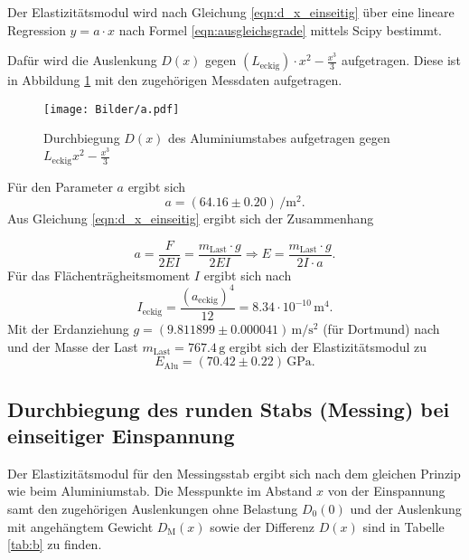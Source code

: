 Der Elastizitätsmodul wird nach Gleichung \eqref{eqn:d_x_einseitig} über eine lineare Regression $y= a\cdot x$ nach Formel \eqref{eqn:ausgleichsgrade} mittels Scipy \cite{scipy} bestimmt.

Dafür wird die Auslenkung $D(x)$ gegen $(L_{\mathrm{eckig}})\cdot x^2-\frac{x^3}{3}$ aufgetragen.
Diese ist in Abbildung \ref{fig:Alu_einseitig} mit den zugehörigen Messdaten aufgetragen.
\begin{figure}
	\centering
	\texttt{[image: Bilder/a.pdf]}
	\caption{Durchbiegung $D(x)$ des Aluminiumstabes aufgetragen gegen $L_{\mathrm{eckig}}x^2-\frac{x^3}{3}$}
	\label{fig:Alu_einseitig}
\end{figure}

Für den Parameter $a$ ergibt sich
\begin{equation*}
	a=(64.16\pm 0.20) \,\si{\per\square\meter}  \text{.}
\end{equation*}
Aus Gleichung \eqref{eqn:d_x_einseitig} ergibt sich der Zusammenhang

\begin{equation}
	a= \frac{F}{2EI}=\frac{m_{\mathrm{Last}}\cdot g}{2EI} \Rightarrow E=\frac{m_{\mathrm{Last}}\cdot g}{2I\cdot a} \text{.}
\end{equation}
Für das Flächenträgheitsmoment $I$ ergibt sich nach \cite{bla}
\begin{equation}
	I_{\mathrm{eckig}}=\frac{(a_{\mathrm{eckig}})^4}{12}= 8.34 \cdot 10^{-10} \,\si{\meter\tothe{4}}	 \text{.}
\end{equation}
Mit der Erdanziehung $g=(9.811899 \pm 0.000041) \,\si{\meter\per\square\second}$ (für Dortmund) nach \cite{G} und der Masse der Last $m_{\mathrm{Last}}=767.4\,\si{\gram}$ ergibt sich der Elastizitätsmodul zu
\begin{equation*}
	E_{\mathrm{Alu}}= (70.42 \pm 0.22)\,\si{\giga\pascal} \text{.}
\end{equation*}
\FloatBarrier
\subsection{Durchbiegung des runden Stabs (Messing) bei einseitiger Einspannung}
Der Elastizitätsmodul für den Messingsstab ergibt sich nach dem gleichen Prinzip wie beim Aluminiumstab.
Die Messpunkte im Abstand $x$ von der Einspannung samt den zugehörigen Auslenkungen ohne Belastung $D_{\mathrm{0}}(0)$
und der Auslenkung mit angehängtem Gewicht $D_{\mathrm{M}}(x)$ sowie der Differenz $D(x)$ sind 
in Tabelle \ref{tab:b} zu finden.

